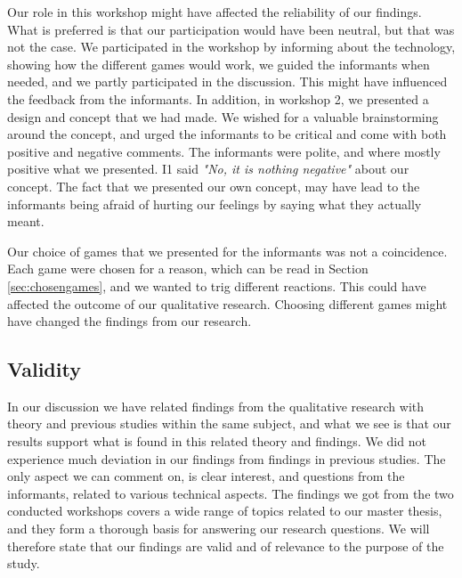 Our role in this workshop might have affected the reliability of our findings. What is preferred is that our participation would have been neutral, but that was not the case. We participated in the workshop by informing about the technology, showing how the different games would work, we guided the informants when needed, and we partly participated in the discussion. This might have influenced the feedback from the informants. In addition, in workshop 2, we presented a design and concept that we had made. We wished for a valuable brainstorming around the concept, and urged the informants to be critical and come with both positive and negative comments. The informants were polite, and where mostly positive what we presented. I1 said \emph{"No, it is nothing negative"} about our concept. The fact that we presented our own concept, may have lead to the informants being afraid of hurting our feelings by saying what they actually meant. 

Our choice of games that we presented for the informants was not a coincidence. Each game were chosen for a reason, which can be read in Section \ref{sec:chosengames}, and we wanted to trig different reactions. This could have affected the outcome of our qualitative research. Choosing different games might have changed the findings from our research.  

\subsection{Validity}

In our discussion we have related findings from the qualitative research with theory and previous studies within the same subject, and what we see is that our results support what is found in this related theory and findings. We did not experience much deviation in our findings from findings in previous studies. The only aspect we can comment on, is clear interest, and questions from the informants, related to various technical aspects. The findings we got from the two conducted workshops covers a wide range of topics related to our master thesis, and they form a thorough basis for answering our research questions. We will therefore state that our findings are valid and of relevance to the purpose of the study. 

